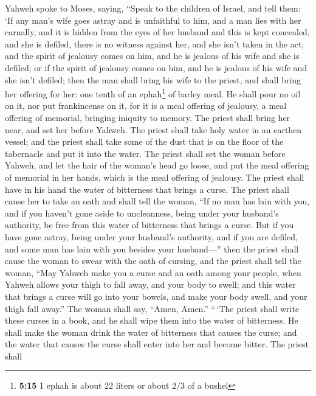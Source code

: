  Yahweh spoke to Moses, saying,  ``Speak
to the children of Israel, and tell them: `If any man's wife goes astray
and is unfaithful to him,  and a man lies with her
carnally, and it is hidden from the eyes of her husband and this is kept
concealed, and she is defiled, there is no witness against her, and she
isn't taken in the act;  and the spirit of jealousy comes
on him, and he is jealous of his wife and she is defiled; or if the
spirit of jealousy comes on him, and he is jealous of his wife and she
isn't defiled;  then the man shall bring his wife to the
priest, and shall bring her offering for her: one tenth of an
ephah\footnote{\textbf{5:15} 1 ephah is about 22 liters or about 2/3 of
  a bushel} of barley meal. He shall pour no oil on it, nor put
frankincense on it, for it is a meal offering of jealousy, a meal
offering of memorial, bringing iniquity to memory.  The
priest shall bring her near, and set her before Yahweh. 
The priest shall take holy water in an earthen vessel; and the priest
shall take some of the dust that is on the floor of the tabernacle and
put it into the water.  The priest shall set the woman
before Yahweh, and let the hair of the woman's head go loose, and put
the meal offering of memorial in her hands, which is the meal offering
of jealousy. The priest shall have in his hand the water of bitterness
that brings a curse.  The priest shall cause her to take
an oath and shall tell the woman, ``If no man has lain with you, and if
you haven't gone aside to uncleanness, being under your husband's
authority, be free from this water of bitterness that brings a curse.
 But if you have gone astray, being under your husband's
authority, and if you are defiled, and some man has lain with you
besides your husband---''  then the priest shall cause
the woman to swear with the oath of cursing, and the priest shall tell
the woman, ``May Yahweh make you a curse and an oath among your people,
when Yahweh allows your thigh to fall away, and your body to swell;
 and this water that brings a curse will go into your
bowels, and make your body swell, and your thigh fall away.'' The woman
shall say, ``Amen, Amen.''  ``\,`The priest shall write
these curses in a book, and he shall wipe them into the water of
bitterness.  He shall make the woman drink the water of
bitterness that causes the curse; and the water that causes the curse
shall enter into her and become bitter.  The priest shall
